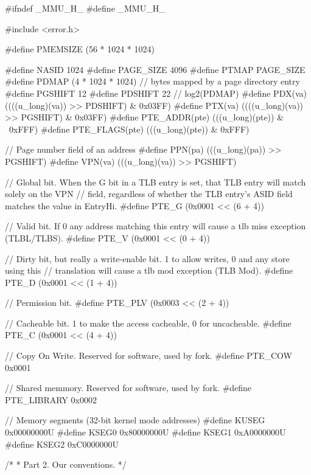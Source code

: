 \begin{CodeBlock}[language=BookC]
#ifndef _MMU_H_
#define _MMU_H_

#include <error.h>

#define PMEMSIZE (56 * 1024 * 1024)

#define NASID 1024
#define PAGE_SIZE 4096
#define PTMAP PAGE_SIZE
#define PDMAP (4 * 1024 * 1024) // bytes mapped by a page directory entry
#define PGSHIFT 12
#define PDSHIFT 22 // log2(PDMAP)
#define PDX(va) ((((u_long)(va)) >> PDSHIFT) & 0x03FF)
#define PTX(va) ((((u_long)(va)) >> PGSHIFT) & 0x03FF)
#define PTE_ADDR(pte) (((u_long)(pte)) & ~0xFFF)
#define PTE_FLAGS(pte) (((u_long)(pte)) & 0xFFF)

// Page number field of an address
#define PPN(pa) (((u_long)(pa)) >> PGSHIFT)
#define VPN(va) (((u_long)(va)) >> PGSHIFT)

// Global bit. When the G bit in a TLB entry is set, that TLB entry will match solely on the VPN
// field, regardless of whether the TLB entry’s ASID field matches the value in EntryHi.
#define PTE_G (0x0001 << (6 + 4))

// Valid bit. If 0 any address matching this entry will cause a tlb miss exception (TLBL/TLBS).
#define PTE_V (0x0001 << (0 + 4))

// Dirty bit, but really a write-enable bit. 1 to allow writes, 0 and any store using this
// translation will cause a tlb mod exception (TLB Mod).
#define PTE_D (0x0001 << (1 + 4))

// Permission bit.
#define PTE_PLV (0x0003 << (2 + 4))

// Cacheable bit. 1 to make the access cacheable, 0 for uncacheable.
#define PTE_C (0x0001 << (4 + 4))

// Copy On Write. Reserved for software, used by fork.
#define PTE_COW 0x0001

// Shared memmory. Reserved for software, used by fork.
#define PTE_LIBRARY 0x0002

// Memory segments (32-bit kernel mode addresses)
#define KUSEG 0x00000000U
#define KSEG0 0x80000000U
#define KSEG1 0xA0000000U
#define KSEG2 0xC0000000U

/*
 * Part 2.  Our conventions.
 */


\end{CodeBlock}
